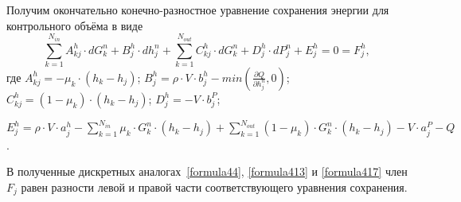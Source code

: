 Получим окончательно конечно-разностное уравнение сохранения энергии для контрольного объёма в виде
\begin{equation}
\label{formula417}
\boxed{\sum_{k=1}^{N_{in}} A_{kj}^h \cdot dG_k^n + B_j^h \cdot dh_j^n + \sum_{k=1}^{N_{out}} C_{kj}^h \cdot dG_k^n + D_j^h \cdot dP_j^n + E_j^h = 0 = F_j^h},
\end{equation}
где $A_{kj}^h=-\mu_k\cdot (h_k-h_j)$; $B_j^h=\rho\cdot V\cdot b_j^h - min\left(\frac{\partial Q}{\partial h_j^n},0 \right)$; $C_{kj}^h=(1-\mu_k)\cdot (h_k-h_j)$;
$D_j^h=-V \cdot b_j^P$; 

\noindent $E_j^h=\rho\cdot V\cdot a_j^h -\sum_{k=1}^{N_{in}} \mu_k \cdot G_k^n \cdot (h_k-h_j) + \sum_{k=1}^{N_{out}} (1-\mu_k) \cdot G_k^n \cdot (h_k-h_j) - V \cdot a_j^P -Q$.

В полученные дискретных аналогах~\eqref{formula44}, \eqref{formula413} и \eqref{formula417} член $F_j$ равен разности левой и правой части соответствующего уравнения сохранения.  











